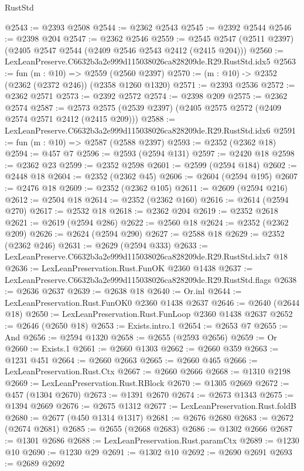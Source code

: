 \begin{lexlean}{RustStd}
\begin{coremodule}
@2543 := @2393 @2508
@2544 := @2362 @2543
@2545 := @2392 @2544
@2546 := @2398 @204
@2547 := @2362 @2546
@2559 := @2545 @2547 (@2511 @2397) (@2405 @2547 @2544 (@2409 @2546 @2543 @2412 (@2415 @204)))
@2560 := LexLeanPreserve.C6632b3a2e999d115038026ca828209de.R29.RustStd.idx5
@2563 := fun (m : @10) => @2559 (@2560 @2397)
@2570 := (m : @10) -> @2352 (@2362 (@2372 @246)) (@2358 @1260 @1320)
@2571 := @2393 @2536
@2572 := @2362 @2571
@2573 := @2392 @2572
@2574 := @2398 @209
@2575 := @2362 @2574
@2587 := @2573 @2575 (@2539 @2397) (@2405 @2575 @2572 (@2409 @2574 @2571 @2412 (@2415 @209)))
@2588 := LexLeanPreserve.C6632b3a2e999d115038026ca828209de.R29.RustStd.idx6
@2591 := fun (m : @10) => @2587 (@2588 @2397)
@2593 := @2352 (@2362 @18)
@2594 := @457 @7
@2596 := @2593 (@2594 @131)
@2597 := @2420 @18
@2598 := @2362 @23
@2599 := @2352 @2598
@2601 := @2599 (@2594 @184)
@2602 := @2448 @18
@2604 := @2352 (@2362 @45)
@2606 := @2604 (@2594 @195)
@2607 := @2476 @18
@2609 := @2352 (@2362 @105)
@2611 := @2609 (@2594 @216)
@2612 := @2504 @18
@2614 := @2352 (@2362 @160)
@2616 := @2614 (@2594 @270)
@2617 := @2532 @18
@2618 := @2362 @204
@2619 := @2352 @2618
@2621 := @2619 (@2594 @286)
@2622 := @2560 @18
@2624 := @2352 (@2362 @209)
@2626 := @2624 (@2594 @290)
@2627 := @2588 @18
@2629 := @2352 (@2362 @246)
@2631 := @2629 (@2594 @333)
@2633 := LexLeanPreserve.C6632b3a2e999d115038026ca828209de.R29.RustStd.idx7 @18
@2636 := LexLeanPreservation.Rust.FunOK @2360 @1438
@2637 := LexLeanPreserve.C6632b3a2e999d115038026ca828209de.R29.RustStd.flags
@2638 := @2636 @2637
@2639 := @2638 @18
@2640 := Or.inl
@2644 := LexLeanPreservation.Rust.FunOK0 @2360 @1438 @2637
@2646 := @2640 (@2644 @18)
@2650 := LexLeanPreservation.Rust.FunLoop @2360 @1438 @2637
@2652 := @2646 (@2650 @18)
@2653 := Exists.intro.{1}
@2654 := @2653 @7
@2655 := And
@2656 := @2594 @1320
@2658 := @2655 (@2593 @2656)
@2659 := Or
@2660 := Exists.{1}
@2661 := @2660 @1303
@2662 := @2660 @359
@2663 := @1231 @451
@2664 := @2660 @2663
@2665 := @2660 @465
@2666 := LexLeanPreservation.Rust.Ctx
@2667 := @2660 @2666
@2668 := @1310 @2198
@2669 := LexLeanPreservation.Rust.RBlock
@2670 := @1305 @2669
@2672 := @457 (@1304 @2670)
@2673 := @1391 @2670
@2674 := @2673 @1343
@2675 := @1394 @2669
@2676 := @2675 @1312
@2677 := LexLeanPreservation.Rust.foldB
@2680 := @2677 (@450 @1314 @1317)
@2681 := @2676 @2680
@2683 := @2672 (@2674 @2681)
@2685 := @2655 (@2668 @2683)
@2686 := @1302 @2666
@2687 := @1301 @2686
@2688 := LexLeanPreservation.Rust.paramCtx
@2689 := @1230 @10
@2690 := @1230 @29
@2691 := @1302 @10
@2692 := @2690 @2691
@2693 := @2689 @2692

\end{coremodule}
\end{lexlean}
